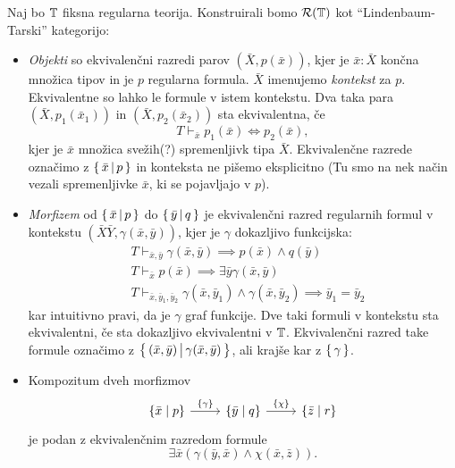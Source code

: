 \documentclass[../kategoricna_logika.tex]{subfiles}
\begin{document}
\begin{definicija}
  Naj bo $\mathbb{T}$ fiksna regularna teorija. Konstruirali bomo
  $\mathcal{R}(\mathbb{T})$ kot "`Lindenbaum-Tarski"' kategorijo:
  \begin{itemize}
  \item \emph{Objekti} so ekvivalenčni razredi parov
    $(\bar{X}, p(\bar{x}))$, kjer je $\bar{x} : \bar{X}$ končna
    množica tipov in je $p$ regularna formula.  $\bar{X}$ imenujemo
    \emph{kontekst} za $p$. Ekvivalentne so lahko le formule v istem
    kontekstu.  Dva taka para $(\bar{X}, p_1(\bar{x}_1))$ in
    $(\bar{X}, p_2(\bar{x}_2))$ sta ekvivalentna, če
      $$T \vdash_{\bar{x}} p_1(\bar{x}) \Leftrightarrow p_2(\bar{x}),$$
      kjer je $\bar{x}$ množica svežih(?) spremenljivk tipa $\bar{X}$.
      Ekvivalenčne razrede označimo z $\left\lbrace\,\bar{x} \,\middle|\, p\,\right\rbrace$
      in konteksta ne pišemo eksplicitno (Tu smo na nek način vezali
      spremenljivke $\bar{x}$, ki se pojavljajo v $p$).
    \item \emph{Morfizem} od $\left\lbrace\,\bar{x} \,\middle|\, p\,\right\rbrace$ do
      $\left\lbrace\,\bar{y} \,\middle|\, q\,\right\rbrace$ je ekvivalenčni razred regularnih
      formul v kontekstu $(\bar{X}\bar{Y}, \gamma(\bar{x},\bar{y}))$,
      kjer je $\gamma$ dokazljivo funkcijska:
      \begin{align*}
        &T \vdash_{\bar{x},\bar{y}} \gamma(\bar{x},\bar{y})  \implies p(\bar{x}) \wedge q(\bar{y}) \\
        &T \vdash_{\bar{x}} p(\bar{x}) \implies \exists \bar{y} \gamma(\bar{x},\bar{y}) \\
        &T \vdash_{\bar{x},\bar{y}_1,\bar{y}_2} \gamma(\bar{x},\bar{y}_1) \wedge \gamma(\bar{x},\bar{y}_2) \implies \bar{y}_1 = \bar{y}_2
      \end{align*}
      kar intuitivno pravi, da je $\gamma$ graf funkcije.  Dve taki
      formuli v kontekstu sta ekvivalentni, če sta dokazljivo
      ekvivalentni v $\mathbb{T}$.  Ekvivalenčni razred take formule označimo z
      $\left\lbrace\,(\bar{x},\bar{y}) \,\middle|\, \gamma(\bar{x},\bar{y})\,\right\rbrace$,
      ali krajše kar z $\left\lbrace\,\gamma\,\right\rbrace$.
    \item Kompozitum dveh morfizmov
      \begin{equation*}
        \begin{tikzcd}[column sep=normal]
          \lbrace \bar{x}  \mid  p\rbrace \ar[r, "\lbrace \gamma \rbrace"] &
          \lbrace \bar{y} \mid q \rbrace \ar[r, "\lbrace \chi \rbrace"] &
          \lbrace \bar{z} \mid r \rbrace
        \end{tikzcd}
      \end{equation*}           
      je podan z ekvivalenčnim razredom
      formule
      $$\exists \bar{x}(\gamma(\bar{y},\bar{x}) \wedge \chi(\bar{x},\bar{z})).$$
    \end{itemize}
  \end{definicija}
\end{document}
